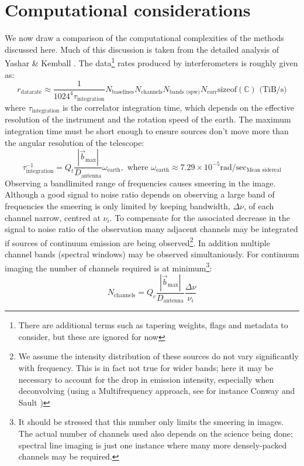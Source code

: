 \section{Computational considerations}
We now draw a comparison of the computational complexities of the methods discussed here. Much of this discussion is taken from the detailed analysis of 
Yashar \& Kemball \cite{yashar2009tdp}.
The data\footnote{There are additional terms such as tapering weights, flags and metadata to consider, but these are ignored for now} rates produced by interferometers is roughly given as:
\begin{equation}
 r_\text{datarate} \approx \frac{1}{1024^4\tau_{\text{integration}}}N_{\text{baselines}}N_{\text{channels}}N_{\text{bands (spw)}}N_{\text{corr}}\text{sizeof}(\mathbb{C})\text{ (TiB/s)}
\end{equation}
where $\tau_{\text{integration}}$ is the correlator integration time, which depends on the effective resolution of the instrument and the rotation speed of the earth.
The maximum integration time must be short enough to ensure sources don't move more than the angular resolution of the telescope:
\begin{equation}
 \tau_{\text{integration}}^{-1} = Q_t\frac{|\vec{b}_{\text{max}}|}{D_{\text{antenna}}}\omega_\text{earth},\text{ where } \omega_\text{earth}\approx 7.29\times10^{-5}\text{rad}/\text{sec}_\text{Mean sidereal}
\end{equation}
Observing a bandlimited range of frequencies causes smeering in the image. Although a good signal to noise ratio depends on observing a large band of frequencies the smeering is only limited
by keeping bandwidth, $\Delta\nu$, of each channel narrow, centred at $\nu_i$. To compensate for the associated decrease in the signal to noise ratio of the observation many adjacent channels may be integrated if 
sources of continuum emission are being observed\footnote{We assume the intensity distribution of these sources do not vary significantly with frequency. This is in fact not true for wider bands; here 
it may be necessary to account for the drop in emission intensity, especially when deconvolving (using a Multifrequency approach, see for instance Conway and Sault \cite[Lecture 21]{taylor1999synthesis})}. In addition 
multiple channel bands (spectral windows) may be observed simultaniously. For continuum imaging the number of channels required is at minimum\footnote{It should 
be stressed that this number only limits the smeering in images. The actual number of channels used also depends on the science being done; spectral line imaging is just one instance where many more 
densely-packed channels may be required.}:
\begin{equation}
 N_{\text{channels}} = Q_c\frac{|\vec{b}_{\text{max}}|}{D_{\text{antenna}}}\frac{\Delta{\nu}}{\nu_i}
\end{equation}

